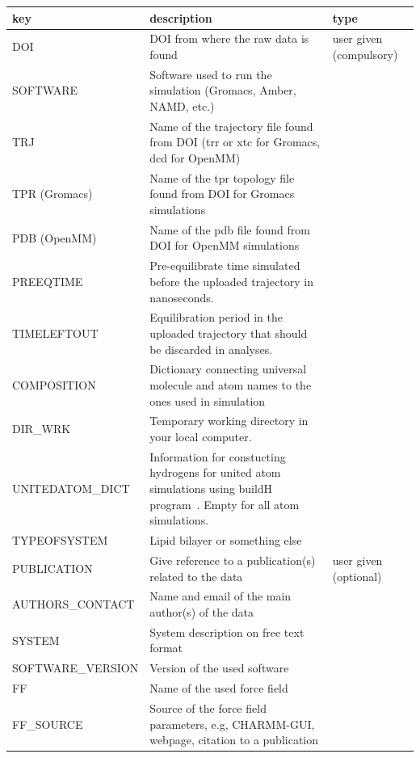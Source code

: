 \documentclass[fleqn,10pt]{wlscirepSI}
\begin{document}
\begin{table}[p]
    \centering
    \begin{tabular}{  p{3.5cm}  p{9.5cm}  p{4.0cm} }
    \toprule
    key & description & type  \\
    \midrule
    DOI & DOI from where the raw data is found & user given (compulsory) \\
    SOFTWARE & Software used to run the simulation (Gromacs, Amber, NAMD, etc.) & \\
    TRJ & Name of the trajectory file found from DOI (trr or xtc for Gromacs, dcd for OpenMM) & \\
    TPR (Gromacs) & Name of the tpr topology file found from DOI for Gromacs simulations & \\
    PDB (OpenMM) & Name of the pdb file found from DOI for OpenMM simulations & \\
    PREEQTIME & Pre-equilibrate time simulated before the uploaded trajectory in nanoseconds. 
    & \\
    TIMELEFTOUT & Equilibration period in the uploaded trajectory that should be discarded in analyses. 
    & \\
    COMPOSITION & Dictionary connecting universal molecule and atom names to the ones used in simulation & \\
    DIR\_WRK & Temporary working directory in your local computer. \\
    UNITEDATOM\_DICT & Information for constucting hydrogens for united atom simulations using buildH program~\cite{santuz21}. Empty for all atom simulations. & \\
    TYPEOFSYSTEM & Lipid bilayer or something else & \\
    \hline
    PUBLICATION & Give reference to a publication(s) related to the data & user given (optional)\\
    AUTHORS\_CONTACT & Name and email of the main author(s) of the data & \\
    SYSTEM & System description on free text format & \\
    SOFTWARE\_VERSION & Version of the used software & \\
    FF & Name of the used force field & \\
    FF\_SOURCE & Source of the force field parameters, e.g, CHARMM-GUI, webpage, citation to a publication & \\

\end{tabular}
\end{table}
\end{document}
